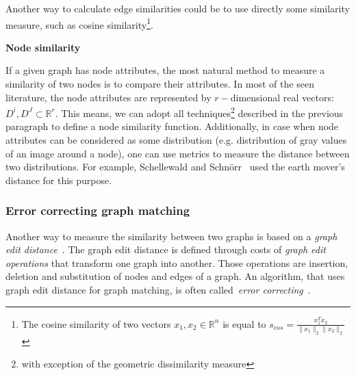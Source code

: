 Another way to calculate edge similarities could be to use directly some similarity measure, such as cosine similarity\footnote{The cosine similarity of two vectors $x_1,x_2\in\mathbb{R}^n$ is equal to $s_{cos}=\frac{x_1^Tx_2}{\|x_1\|_2\|x_2\|_2}$}.

\textbf{Node similarity}

If a given graph has node attributes, the most natural method to measure a similarity of two nodes is to compare their attributes. In most of the seen literature, the node attributes are represented by $r-$dimensional real vectors: $D^i,D^J\subset\mathbb{R}^r$. This means, we can adopt all techniques\footnote{with exception of the geometric dissimilarity measure} described in the previous paragraph to define a node similarity function. Additionally, in case when node attributes can be considered as some distribution (e.g. distribution of gray values of an image around a node), one can use metrics to measure the distance between two distributions. For example, Schellewald and Schn\"orr~\cite{Schellewald2005} used the earth mover's distance for this purpose.
\subsubsection{Error correcting graph matching}
Another way to measure the similarity between two graphs is based on a \emph{graph edit distance}~\cite{Bunke1983_inexactGM}. The graph edit distance is defined through costs of \emph{graph edit operations} that transform one graph into another. Those operations are insertion, deletion and substitution of nodes and edges of a graph. An algorithm, that uses graph edit distance for graph matching, is often called~\emph{error correcting}~\cite{Conte2004}.

